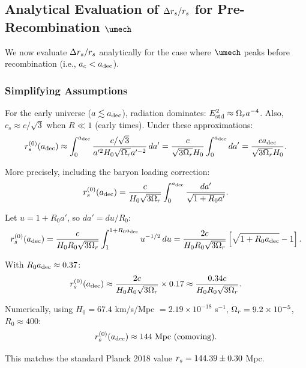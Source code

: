 \subsection{Analytical Evaluation of $\Delta r_s/r_s$ for Pre-Recombination $\umech$}
\label{sec:analytical_Deltars}

We now evaluate $\Delta r_s/r_s$ analytically for the case where $\umech$ peaks before recombination (i.e., $a_c < a_{\mathrm{dec}}$).

\subsubsection{Simplifying Assumptions}
For the early universe ($a \lesssim a_{\mathrm{dec}}$), radiation dominates: $E_{\mathrm{std}}^2 \approx \Omega_r a^{-4}$. Also, $c_s \approx c/\sqrt{3}$ when $R \ll 1$ (early times). Under these approximations:
\begin{equation}
r_s^{(0)}(a_{\mathrm{dec}}) \approx \int_0^{a_{\mathrm{dec}}} \frac{c/\sqrt{3}}{a'^2 H_0 \sqrt{\Omega_r} a'^{-2}} \, da' = \frac{c}{\sqrt{3\Omega_r} H_0} \int_0^{a_{\mathrm{dec}}} da' = \frac{c a_{\mathrm{dec}}}{\sqrt{3\Omega_r} H_0}.
\end{equation}

More precisely, including the baryon loading correction:
\begin{equation}
\label{eq:rs0_exact}
r_s^{(0)}(a_{\mathrm{dec}}) = \frac{c}{H_0 \sqrt{3\Omega_r}} \int_0^{a_{\mathrm{dec}}} \frac{da'}{\sqrt{1 + R_0 a'}}.
\end{equation}

Let $u = 1 + R_0 a'$, so $da' = du/R_0$:
\begin{equation}
r_s^{(0)}(a_{\mathrm{dec}}) = \frac{c}{H_0 R_0 \sqrt{3\Omega_r}} \int_1^{1+R_0a_{\mathrm{dec}}} u^{-1/2} \, du = \frac{2c}{H_0 R_0 \sqrt{3\Omega_r}} \left[ \sqrt{1 + R_0a_{\mathrm{dec}}} - 1 \right].
\end{equation}

With $R_0 a_{\mathrm{dec}} \approx 0.37$:
\begin{equation}
r_s^{(0)}(a_{\mathrm{dec}}) \approx \frac{2c}{H_0 R_0 \sqrt{3\Omega_r}} \times 0.17 \approx \frac{0.34c}{H_0 R_0 \sqrt{3\Omega_r}}.
\end{equation}

Numerically, using $H_0 = 67.4$ km/s/Mpc $= 2.19 \times 10^{-18}$ s$^{-1}$, $\Omega_r = 9.2 \times 10^{-5}$, $R_0 \approx 400$:
\begin{equation}
r_s^{(0)}(a_{\mathrm{dec}}) \approx 144 \text{ Mpc (comoving)}.
\end{equation}

This matches the standard Planck 2018 value $r_s = 144.39 \pm 0.30$ Mpc.

